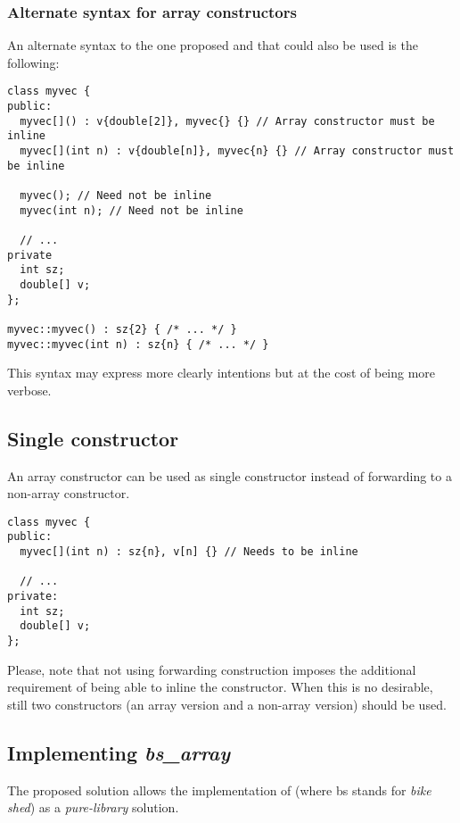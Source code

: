 \subsubsection{Alternate syntax for array constructors}

An alternate syntax to the one proposed and that could also be used is the following:

\begin{lstlisting}
class myvec {
public:
  myvec[]() : v{double[2]}, myvec{} {} // Array constructor must be inline
  myvec[](int n) : v{double[n]}, myvec{n} {} // Array constructor must be inline

  myvec(); // Need not be inline
  myvec(int n); // Need not be inline

  // ...
private
  int sz;
  double[] v;
};

myvec::myvec() : sz{2} { /* ... */ }
myvec::myvec(int n) : sz{n} { /* ... */ }
\end{lstlisting}

This syntax may express more clearly intentions but at the cost of being more verbose.


\subsection{Single constructor}

An array constructor can be used as single constructor instead of forwarding to a
non-array constructor.

\begin{lstlisting}
class myvec {
public:
  myvec[](int n) : sz{n}, v[n] {} // Needs to be inline

  // ...
private:
  int sz;
  double[] v;
};
\end{lstlisting}

Please, note that not using forwarding construction imposes the additional requirement
of being able to inline the constructor. When this is no desirable, still two constructors
(an array version and a non-array version) should be used.



\subsection{Implementing \emph{bs\_array}}

The proposed solution allows the implementation of 
(where bs stands for \emph{bike shed}) as a \emph{pure-library} solution.

